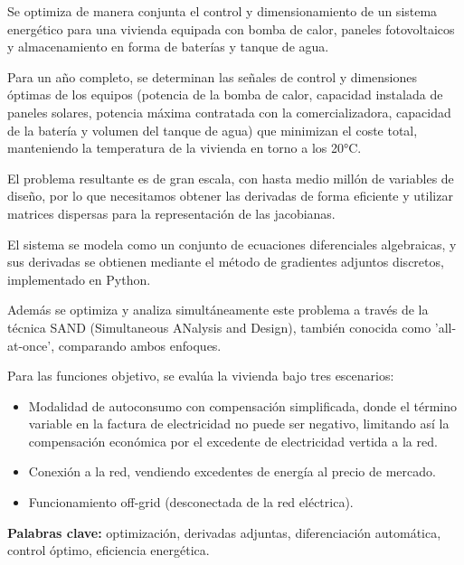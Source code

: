 Se optimiza de manera conjunta el control y dimensionamiento de un sistema
energético para una vivienda equipada con bomba de calor, paneles fotovoltaicos
y almacenamiento en forma de baterías y tanque de agua.

Para un año completo, se determinan las señales de control y dimensiones
óptimas de los equipos (potencia de la bomba de calor, capacidad instalada de
paneles solares, potencia máxima contratada con la comercializadora, capacidad
de la batería y volumen del tanque de agua) que minimizan el coste total,
manteniendo la temperatura de la vivienda en torno a los 20°C.

El problema resultante es de gran escala, con hasta medio millón de variables
de diseño, por lo que necesitamos obtener las derivadas de forma eficiente y
utilizar matrices dispersas para la representación de las jacobianas.

El sistema se modela como un conjunto de ecuaciones diferenciales algebraicas,
y sus derivadas se obtienen mediante el método de gradientes adjuntos
discretos, implementado en Python.

Además se optimiza y analiza simultáneamente este problema a través de la
técnica SAND (Simultaneous ANalysis and Design), también conocida como
'all-at-once', comparando ambos enfoques.

Para las funciones objetivo, se evalúa la vivienda bajo tres escenarios:

\begin{itemize}
	\item Modalidad de autoconsumo con compensación simplificada, donde el término
	      variable en la factura de electricidad no puede ser negativo, limitando así la
	      compensación económica por el excedente de electricidad vertida a la red.
	\item Conexión a la red, vendiendo excedentes de energía al precio de mercado.
	\item Funcionamiento off-grid (desconectada de la red eléctrica).
\end{itemize}
\begin{flushleft}
	\textbf{Palabras clave:} optimización, derivadas adjuntas, diferenciación
	automática, control óptimo, eficiencia energética.
\end{flushleft}
